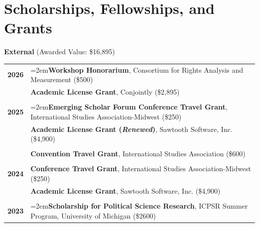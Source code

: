 \documentclass[letterpaper,12pt]{article}
\begin{document}
\section{Scholarships, Fellowships, and Grants}
\textbf{External} (Awarded Value: \$16,895)
\begin{xltabular}{\dimexpr\textwidth-0in}{p{1.5in}X}

\textbf{2026}          		& \hangindent=2em\textbf{Workshop Honorarium}, Consortium for Rights Analysis and Measurement (\$500)\\ 
                              		& \textbf{Academic License Grant}, Conjointly (\$2,895)\\ \\

\textbf{2025}          		& \hangindent=2em\textbf{Emerging Scholar Forum Conference Travel Grant}, International Studies Association-Midwest (\$250)\\

					& \textbf{Academic License Grant (\textit{Renewed})}, Sawtooth Software, Inc. (\$4,900)\\ \\

                              		& \textbf{Convention Travel Grant}, International Studies Association (\$600)\\ \\
                              
\textbf{2024}          		& \textbf{Conference Travel Grant}, International Studies Association-Midwest (\$250)\\

                              		& \textbf{Academic License Grant}, Sawtooth Software, Inc. (\$4,900)\\ \\
                              
\textbf{2023}          		& \hangindent=2em\textbf{Scholarship for Political Science Research}, ICPSR Summer Program, \mbox{University} of Michigan (\$2600)
\end{xltabular}
\end{document}
